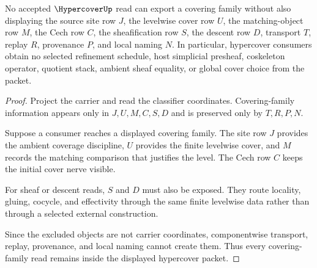 \begin{theorem}
\label{thm:hypercover-covering-family-nonescape}
No accepted $\HypercoverUp$ read can export a covering family without also displaying the source site row $J$, the levelwise cover row $U$, the matching-object row $M$, the Cech row $C$, the sheafification row $S$, the descent row $D$, transport $T$, replay $R$, provenance $P$, and local naming $N$. In particular, hypercover consumers obtain no selected refinement schedule, host simplicial presheaf, coskeleton operator, quotient stack, ambient sheaf equality, or global cover choice from the packet.
\end{theorem}
\begin{proof}
Project the carrier and read the classifier coordinates. Covering-family information appears only in $J,U,M,C,S,D$ and is preserved only by $T,R,P,N$.

Suppose a consumer reaches a displayed covering family. The site row $J$ provides the ambient coverage discipline, $U$ provides the finite levelwise cover, and $M$ records the matching comparison that justifies the level. The Cech row $C$ keeps the initial cover nerve visible.

For sheaf or descent reads, $S$ and $D$ must also be exposed. They route locality, gluing, cocycle, and effectivity through the same finite levelwise data rather than through a selected external construction.

Since the excluded objects are not carrier coordinates, componentwise transport, replay, provenance, and local naming cannot create them. Thus every covering-family read remains inside the displayed hypercover packet.
\end{proof}




